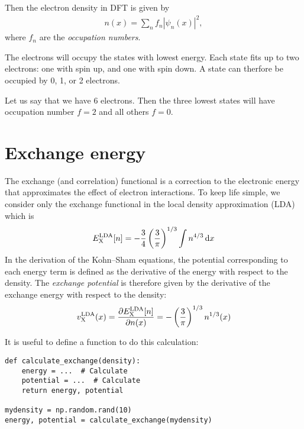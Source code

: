 \documentclass{article}
\begin{document}

Then the electron density in DFT is given by
\begin{align}
  n(x) = \sum_n f_n |\psi_n(x)|^2,
\end{align}
where $f_n$ are the \emph{occupation numbers}.

The electrons will
occupy the states with lowest energy.  Each
state fits up to two electrons: one with spin up, and one with spin down.
A state can therfore be occupied by 0, 1, or 2 electrons.

Let us say that we have 6 electrons.  Then the three lowest states
will have occupation number $f=2$ and all others $f=0$.


\section*{Exchange energy}
The exchange (and correlation) functional is a correction to the
electronic energy that approximates the effect of electron interactions.
To keep life simple, we consider only the exchange functional in the local density approximation (LDA) which is
\begin{align}
  E_{\mathrm{X}}^{\mathrm{LDA}}[n] = -\frac 34 \left(\frac 3 \pi\right)^{1/3} \int n^{4/3} \,\mathrm d x
\end{align}
In the derivation of the Kohn--Sham equations, the potential
corresponding to each energy term is defined
as the derivative of the energy with respect to the density.
The \emph{exchange potential} is therefore given by the derivative
of the exchange energy with respect to the density:
\begin{align}
  v_{\mathrm{X}}^{\mathrm{LDA}}(x) = \frac{\partial E_{\mathrm{X}}^{\mathrm{LDA}}[n]}{\partial n(x)} = -\left(\frac3 \pi\right)^{1/3}
  n^{1/3}(x)
\end{align}


It is useful to define a function to do this calculation:
\begin{lstlisting}
def calculate_exchange(density):
    energy = ...  # Calculate
    potential = ...  # Calculate
    return energy, potential

mydensity = np.random.rand(10)
energy, potential = calculate_exchange(mydensity)
\end{lstlisting}
\end{document}
